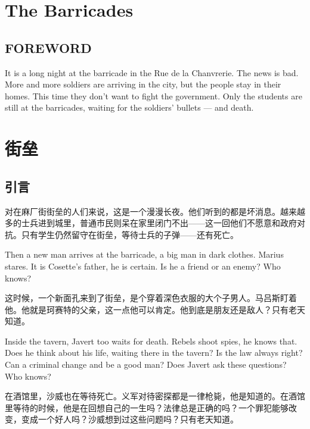 \documentclass[fontset=ubuntu, zihao=5]{ctexart}
\begin{document}
\begin{paracol}{2}

  \section{The Barricades}

  \subsection*{FOREWORD}

  It is a long night at the barricade in the Rue de la Chanvrerie. The news is bad. More and more soldiers are arriving in the city, but the people stay in their homes. This time they don't want to fight the government. Only the students are still at the barricades, waiting for the soldiers' bullets --- and death.

\switchcolumn

\section*{街垒}

\subsection*{引言}

对在麻厂街街垒的人们来说，这是一个漫漫长夜。他们听到的都是坏消息。越来越多的士兵进到城里，普通市民则呆在家里闭门不出——这一回他们不愿意和政府对抗。只有学生仍然留守在街垒，等待士兵的子弹——还有死亡。

\switchcolumn*

Then a new man arrives at the barricade, a big man in dark clothes. Marius stares. It is Cosette's father, he is certain. Is he a friend or an enemy? Who knows?

\switchcolumn

这时候，一个新面孔来到了街垒，是个穿着深色衣服的大个子男人。马吕斯盯着他。他就是珂赛特的父亲，这一点他可以肯定。他到底是朋友还是敌人？只有老天知道。

\switchcolumn*

Inside the tavern, Javert too waits for death. Rebels shoot spies, he knows that. Does he think about his life, waiting there in the tavern? Is the law always right? Can a criminal change and be a good man? Does Javert ask these questions? Who knows?

\switchcolumn

在酒馆里，沙威也在等待死亡。义军对待密探都是一律枪毙，他是知道的。在酒馆里等待的时候，他是在回想自己的一生吗？法律总是正确的吗？一个罪犯能够改变，变成一个好人吗？沙威想到过这些问题吗？只有老天知道。


\end{paracol}
\end{document}
